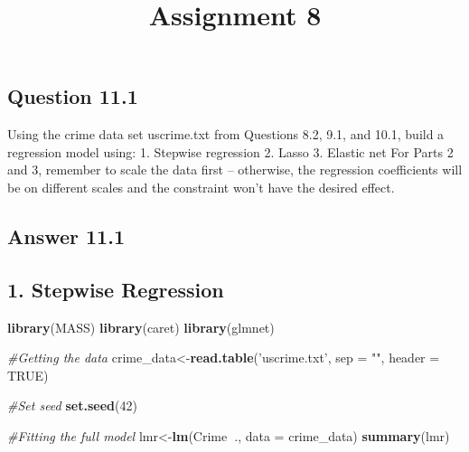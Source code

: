 \documentclass[
]{article}
\title{Assignment 8}
\author{}
\date{\vspace{-2.5em}}
\newenvironment{Shaded}{\begin{snugshade}}{\end{snugshade}}
\newcommand{\CommentTok}[1]{\textcolor[rgb]{0.56,0.35,0.01}{\textit{#1}}}
\newcommand{\DataTypeTok}[1]{\textcolor[rgb]{0.13,0.29,0.53}{#1}}
\newcommand{\DecValTok}[1]{\textcolor[rgb]{0.00,0.00,0.81}{#1}}
\newcommand{\KeywordTok}[1]{\textcolor[rgb]{0.13,0.29,0.53}{\textbf{#1}}}
\newcommand{\NormalTok}[1]{#1}
\newcommand{\OperatorTok}[1]{\textcolor[rgb]{0.81,0.36,0.00}{\textbf{#1}}}
\newcommand{\OtherTok}[1]{\textcolor[rgb]{0.56,0.35,0.01}{#1}}
\newcommand{\StringTok}[1]{\textcolor[rgb]{0.31,0.60,0.02}{#1}}
\begin{document}
\maketitle

\hypertarget{question-11.1}{%
\subsection{Question 11.1}\label{question-11.1}}

Using the crime data set uscrime.txt from Questions 8.2, 9.1, and 10.1,
build a regression model using: 1. Stepwise regression 2. Lasso 3.
Elastic net For Parts 2 and 3, remember to scale the data first --
otherwise, the regression coefficients will be on different scales and
the constraint won't have the desired effect.

\hypertarget{answer-11.1}{%
\subsection{Answer 11.1}\label{answer-11.1}}

\hypertarget{stepwise-regression}{%
\subsection{1. Stepwise Regression}\label{stepwise-regression}}

\begin{Shaded}
\begin{Highlighting}[]
\KeywordTok{library}\NormalTok{(MASS)}
\KeywordTok{library}\NormalTok{(caret)}
\KeywordTok{library}\NormalTok{(glmnet)}
\end{Highlighting}
\end{Shaded}

\begin{Shaded}
\begin{Highlighting}[]
\CommentTok{#Getting the data}
\NormalTok{crime_data<-}\KeywordTok{read.table}\NormalTok{(}\StringTok{'uscrime.txt'}\NormalTok{, }\DataTypeTok{sep =} \StringTok{""}\NormalTok{, }\DataTypeTok{header =} \OtherTok{TRUE}\NormalTok{)}

\CommentTok{#Set seed }
\KeywordTok{set.seed}\NormalTok{(}\DecValTok{42}\NormalTok{)}

\CommentTok{#Fitting the full model}
\NormalTok{lmr<-}\KeywordTok{lm}\NormalTok{(Crime}\OperatorTok{~}\NormalTok{., }\DataTypeTok{data =}\NormalTok{ crime_data)}
\KeywordTok{summary}\NormalTok{(lmr)}
\end{Highlighting}
\end{Shaded}
\end{document}

